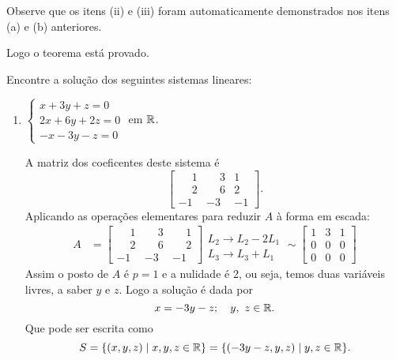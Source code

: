\begin{prova}
	Observe que os itens (ii) e (iii) foram automaticamente demonstrados nos itens (a) e (b) anteriores.

	Logo o teorema est\'a provado.
\end{prova}

\begin{exemplo}
	Encontre a solu\c{c}\~ao dos seguintes sistemas lineares:
	\begin{enumerate}[label={\arabic*})]
		\item $\begin{cases}
		x + 3y + z = 0\\
		2x + 6y + 2z = 0\\
		-x - 3y - z = 0
		\end{cases}$ em $\mathbb{R}$.
		\begin{solucao}
		A matriz dos coeficentes deste sistema \'e
		\[
			\begin{bmatrix}
				\phantom{-}1 & \phantom{-}3 & 1\\
				\phantom{-}2 & \phantom{-}6 & 2\\
				-1 & -3 & -1
			\end{bmatrix}.
		\]
		Aplicando as opera\c{c}\~oes elementares para reduzir $A$ \`a forma em escada:
		\begin{align*}
			A &=
				\left[
					\begin{array}{ccc}
						\phantom{-}1 & \phantom{-}3 & \phantom{-}1 \\
						\phantom{-}2 & \phantom{-}6 & \phantom{-}2 \\
						-1 & -3 & -1
					\end{array}
				\right]
				\begin{array}{l}
					\\
					L_2 \to L_2 - 2L_1\\
					L_3 \to L_3 + L_1
				\end{array} \sim
				\left[
				\begin{array}{ccc}
					1 & 3 & 1 \\
					0 & 0 & 0 \\
					0 & 0 & 0
				\end{array}
				\right]
		\end{align*}
		Assim o posto de $A$ \'e $p = 1$ e a nulidade \'e 2, ou seja, temos duas vari\'aveis livres, a saber $y$ e $z$. Logo a solu\c{c}\~ao \'e dada por
		\[
			x = -3y - z;\quad y,\ z \in \mathbb{R}.
		\]
		Que pode ser escrita como
		\[
			S = \{(x, y ,z) \mid x, y, z \in \mathbb{R} \} = \{(-3y - z, y, z) \mid y, z \in \mathbb{R}\}.
		\]
		\end{solucao}

\end{enumerate}
\end{exemplo}
